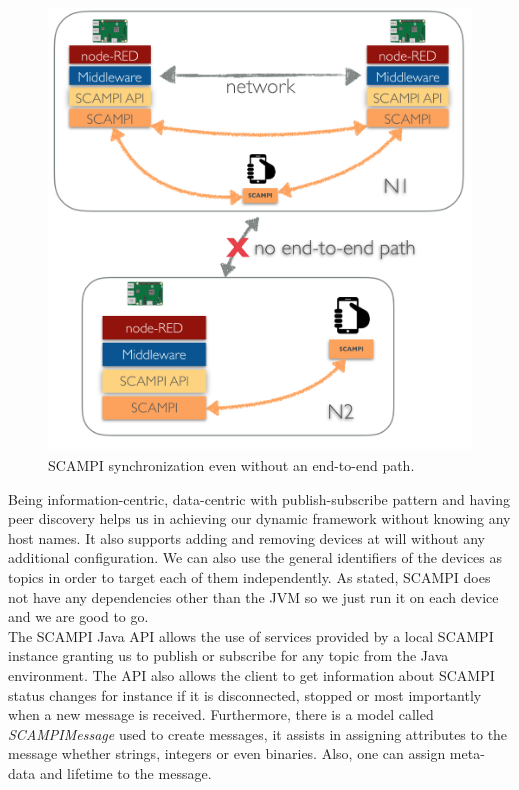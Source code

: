 \begin{figure}[H]
	\centering
	\includegraphics[scale=0.4]{images/scampi.png}
	\caption{SCAMPI synchronization even without an end-to-end path. }
	\label{fig:scampi-design}
\end{figure}

\noindent Being information-centric, data-centric with publish-subscribe pattern and having peer discovery helps us in achieving our dynamic framework without knowing any host names. It  also supports adding and removing devices at will without any additional configuration. We can also use the general identifiers of the devices as topics in order to target each of them independently. As stated, SCAMPI does not have any dependencies other than the JVM so we just run it on each device and we are  good to go. \\


\noindent The SCAMPI Java API allows the use of  services provided by a local SCAMPI instance granting us to publish or subscribe for any topic from the Java environment. The API also allows the client to get information about  SCAMPI status changes  for instance if it is disconnected, stopped or most importantly when a new message is received. Furthermore, there is a model called \textit{SCAMPIMessage} used to create messages, it assists in assigning attributes to the message whether strings, integers or even binaries. Also, one can assign meta-data and lifetime to the message.


